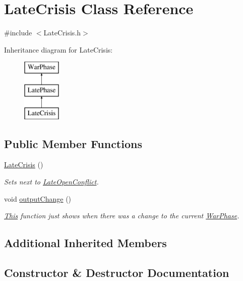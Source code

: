 \hypertarget{class_late_crisis}{}\section{Late\+Crisis Class Reference}
\label{class_late_crisis}


{\ttfamily \#include $<$Late\+Crisis.\+h$>$}

Inheritance diagram for Late\+Crisis\+:\begin{figure}[H]
\begin{center}
\leavevmode
\includegraphics[height=3.000000cm]{class_late_crisis}
\end{center}
\end{figure}
\subsection*{Public Member Functions}
\begin{DoxyCompactItemize}
\item 
\mbox{\hyperlink{class_late_crisis_a5e2b51e4feb8fb15d75fa1377d6c4b38}{Late\+Crisis}} ()
\begin{DoxyCompactList}\small\item\em Sets next to \mbox{\hyperlink{class_late_open_conflict}{Late\+Open\+Conflict}}. \end{DoxyCompactList}\item 
void \mbox{\hyperlink{class_late_crisis_ae7e081694e9dd087a9b5e7ea489145bf}{output\+Change}} ()
\begin{DoxyCompactList}\small\item\em \mbox{\hyperlink{class_this}{This}} function just shows when there was a change to the current \mbox{\hyperlink{class_war_phase}{War\+Phase}}. \end{DoxyCompactList}\end{DoxyCompactItemize}
\subsection*{Additional Inherited Members}


\subsection{Constructor \& Destructor Documentation}
\mbox{\label{class_late_crisis_a5e2b51e4feb8fb15d75fa1377d6c4b38}} 
